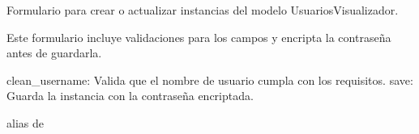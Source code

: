 \documentclass[letterpaper,10pt,spanish]{sphinxmanual}
\begin{document}
\begin{fulllineitems}

\pysigstartsignatures
{}
\pysigstopsignatures
\sphinxAtStartPar
Formulario para crear o actualizar instancias del modelo UsuariosVisualizador.

\sphinxAtStartPar
Este formulario incluye validaciones para los campos y encripta la contraseña antes de guardarla.
\begin{description}
\sphinxAtStartPar
clean\_username: Valida que el nombre de usuario cumpla con los requisitos.
save: Guarda la instancia con la contraseña encriptada.

\end{description}


\begin{fulllineitems}

\pysigstartsignatures
{}
\pysigstopsignatures

\begin{fulllineitems}

\pysigstartsignatures
{}
\pysigstopsignatures
\end{fulllineitems}



\begin{fulllineitems}

\pysigstartsignatures
{}
\pysigstopsignatures
\sphinxAtStartPar
alias de 

\end{fulllineitems}



\end{fulllineitems}
\end{fulllineitems}
\end{document}
